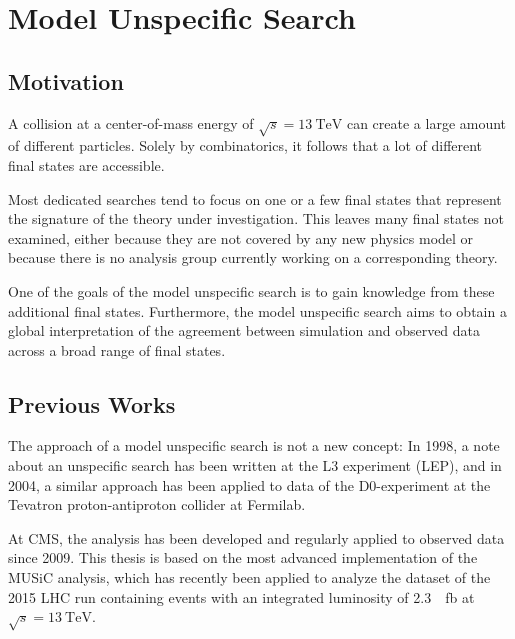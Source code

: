 
\chapter{Model Unspecific Search}

\section{Motivation}
A collision at a center-of-mass energy of $\sqrt{s} = \SI{13}{\TeV}$ can create a large amount of different particles. Solely by combinatorics, it follows that a lot of different final states are accessible.

Most dedicated searches tend to focus on one or a few final states that represent the signature of the theory under investigation. This leaves many final states not examined, either because they are not covered by any new physics model or because there is no analysis group currently working on a corresponding theory.

One of the goals of the model unspecific search is to gain knowledge from these additional final states. Furthermore, the model unspecific search aims to obtain a global interpretation of the agreement between simulation and observed data across a broad range of final states.

\section{Previous Works}
The approach of a model unspecific search is not a new concept: In 1998, a note about an unspecific search has been written at the L3 experiment (\ac{LEP})\cite{Hebbeker:GlobalComparisonL3}, and in 2004, a similar approach has been applied to data of the D0-experiment at the Tevatron proton-antiproton collider at Fermilab\cite{Biallass:ModelIndependentSearch}.

At \ac{CMS}, the analysis has been developed and regularly applied to observed data since 2009\cite{Schmitz:ModelUnspecificSearch,Hof:ImplementationModelIndependent,Dietz-Laursonn:ModelUnspecificSearch,Olschewski:StudyAlternativeStatistical,Brodski:ModelUnspecificSearch,Pieta:MUSiCModelUnspecific,Papacz:ModelUnspecificSearch,Albert:ExtensionModelUnspecific,Roemer:ModelUnspecificSearch,CMS:CMS-PAS-EXO-14-016,Knutzen:softwarereinterpretationmodel,Durchardt:MUSiCModelUnspecific}. 
This thesis is based on the most advanced implementation of the \ac{MUSiC} analysis, which has recently been applied to analyze the dataset of the 2015 \ac{LHC} run\cite{Roemer:ModelUnspecificSearch} containing events with an integrated luminosity of \SI{2.3}{\per\femto\barn} at $\sqrt{s} = \SI{13}{\TeV}$.

